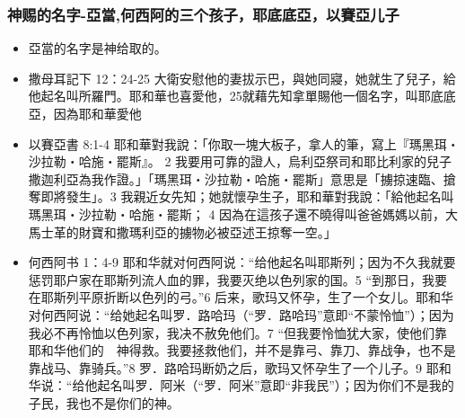 \subsubsection{神赐的名字-亞當,何西阿的三个孩子，耶底底亞，以賽亞儿子}
\begin{itemize} 
\itemsep-.25em
\item 亞當的名字是神给取的。
\item 撒母耳記下 12：24-25
大衛安慰他的妻拔示巴，與她同寢，她就生了兒子，給他起名叫所羅門。耶和華也喜愛他，25就藉先知拿單賜他一個名字，叫耶底底亞，因為耶和華愛他
\item 以賽亞書 8:1-4
耶和華對我說：「你取一塊大板子，拿人的筆，寫上『瑪黑珥‧沙拉勒‧哈施‧罷斯』。 2 我要用可靠的證人，烏利亞祭司和耶比利家的兒子撒迦利亞為我作證。」「瑪黑珥‧沙拉勒‧哈施‧罷斯」意思是「擄掠速臨、搶奪即將發生」。3 我親近女先知；她就懷孕生子，耶和華對我說：「給他起名叫瑪黑珥‧沙拉勒‧哈施‧罷斯； 4 因為在這孩子還不曉得叫爸爸媽媽以前，大馬士革的財寶和撒瑪利亞的擄物必被亞述王掠奪一空。」
\item 何西阿书 1：4-9
耶和华就对何西阿说：“给他起名叫耶斯列；因为不久我就要惩罚耶户家在耶斯列流人血的罪，我要灭绝以色列家的国。5 “到那日，我要在耶斯列平原折断以色列的弓。”6 后来，歌玛又怀孕，生了一个女儿。耶和华对何西阿说：“给她起名叫罗．路哈玛（“罗．路哈玛”意即“不蒙怜恤”）；因为我必不再怜恤以色列家，我决不赦免他们。7 “但我要怜恤犹大家，使他们靠耶和华他们的　神得救。我要拯救他们，并不是靠弓、靠刀、靠战争，也不是靠战马、靠骑兵。”8 罗．路哈玛断奶之后，歌玛又怀孕生了一个儿子。9 耶和华说：“给他起名叫罗．阿米（“罗．阿米”意即“非我民”）；因为你们不是我的子民，我也不是你们的神。
\end{itemize}

